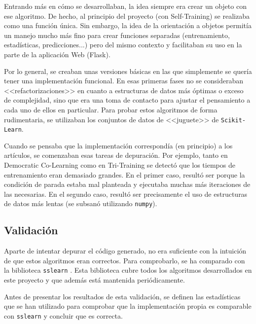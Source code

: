 Entrando más en cómo se desarrollaban, la idea siempre era crear un objeto con
ese algoritmo. De hecho, al principio del proyecto (con Self-Training) se
realizaba como una función única. Sin embargo, la idea de la orientación a
objetos permitía un manejo mucho más fino para crear funciones separadas
(entrenamiento, estadísticas, predicciones...) pero del mismo contexto y
facilitaban su uso en la parte de la aplicación Web (Flask).

Por lo general, se creaban unas versiones básicas en las que simplemente se
quería tener una implementación funcional. En esas primeras fases no se
consideraban <<refactorizaciones>> en cuanto a estructuras de datos más óptimas
o exceso de complejidad, sino que era una toma de contacto para ajustar el
pensamiento a cada uno de ellos en particular. Para probar estos algoritmos de
forma rudimentaria, se utilizaban los conjuntos de datos de <<juguete>> de
\texttt{Scikit-Learn}.

Cuando se pensaba que la implementación correspondía (en principio) a los
artículos, se comenzaban esas tareas de depuración. Por ejemplo, tanto en
Democratic Co-Learning como en Tri-Training se detectó que los tiempos de
entrenamiento eran demasiado grandes. En el primer caso, resultó ser porque la
condición de parada estaba mal planteada y ejecutaba muchas más iteraciones de
las necesarias. En el segundo caso, resultó ser precisamente el uso de
estructuras de datos más lentas (se subsanó utilizando \texttt{numpy}).

\subsection{Validación}

Aparte de intentar depurar el código generado, no era suficiente con la
intuición de que estos algoritmos eran correctos. Para comprobarlo, se ha
comparado con la biblioteca \texttt{sslearn}
\cite{jose_luis_garrido_labrador_2023_7781117}. Esta biblioteca cubre todos los
algoritmos desarrollados en este proyecto y que además está mantenida
periódicamente.

Antes de presentar los resultados de esta validación, se definen las
estadísticas que se han utilizado para comprobar que la implementación propia es
comparable con \texttt{sslearn} y concluir que es correcta.

